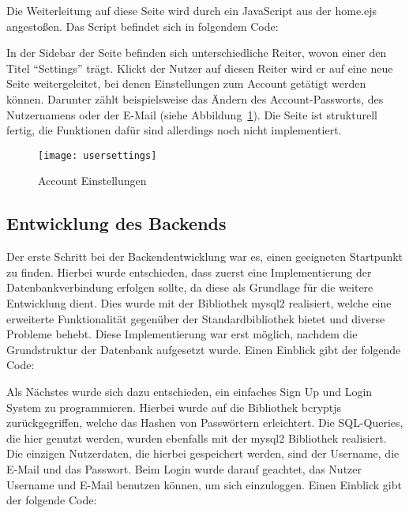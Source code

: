 Die Weiterleitung auf diese Seite wird durch ein JavaScript aus der home.ejs angestoßen.
Das Script befindet sich in folgendem Code:

\vspace{1em}

\vspace{1em}

In der Sidebar der Seite befinden sich unterschiedliche Reiter, wovon einer den Titel ``Settings'' trägt.
Klickt der Nutzer auf diesen Reiter wird er auf eine neue Seite weitergeleitet, bei denen Einstellungen zum Account getätigt werden können.
Darunter zählt beispielsweise das Ändern des Account-Passworts, des Nutzernamens oder der E-Mail (siehe Abbildung~\ref{fig:usersettings}).
Die Seite ist strukturell fertig, die Funktionen dafür sind allerdings noch nicht implementiert.
\newpage
\begin{figure}[h]
    \centering
    \texttt{[image: usersettings]}
    \caption{Account Einstellungen}
    \label{fig:usersettings}
\end{figure}

\subsection{Entwicklung des Backends}\label{subsec:EntwicklungDesBackends}
Der erste Schritt bei der Backendentwicklung war es, einen geeigneten Startpunkt zu finden.
Hierbei wurde entschieden, dass zuerst eine Implementierung der Datenbankverbindung erfolgen sollte, da diese als Grundlage für die weitere Entwicklung dient.
Dies wurde mit der Bibliothek mysql2 realisiert, welche eine erweiterte Funktionalität gegenüber der Standardbibliothek bietet und diverse Probleme behebt.
Diese Implementierung war erst möglich, nachdem die Grundstruktur der Datenbank aufgesetzt wurde.
Einen Einblick gibt der folgende Code:

\vspace{1em}

\vspace{1em}

Als Nächstes wurde sich dazu entschieden, ein einfaches Sign Up und Login System zu programmieren.
Hierbei wurde auf die Bibliothek bcryptjs zurückgegriffen, welche das Hashen von Passwörtern erleichtert.
Die SQL-Queries, die hier genutzt werden, wurden ebenfalls mit der mysql2 Bibliothek realisiert.
Die einzigen Nutzerdaten, die hierbei gespeichert werden, sind der Username, die E-Mail und das Passwort.
Beim Login wurde darauf geachtet, das Nutzer Username und E-Mail benutzen können, um sich einzuloggen.
Einen Einblick gibt der folgende Code:

